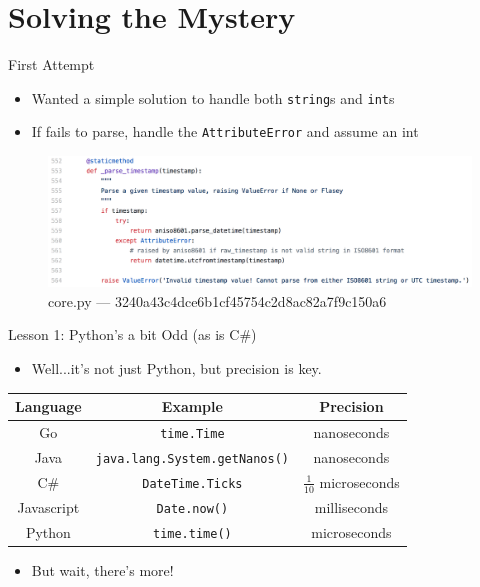 \documentclass[10pt]{beamer}
\begin{document}
\section{Solving the Mystery}
\begin{frame}{First Attempt}
	\begin{itemize}
		\item Wanted a simple solution to handle both \texttt{string}s and \texttt{int}s
		\item If fails to parse, handle the \texttt{AttributeError} and assume an int
	\end{itemize}
	\begin{figure}
		\centering
		\includegraphics[width=\textwidth]{images/commit1.png}
		\caption{core.py --- 3240a43c4dce6b1cf45754c2d8ac82a7f9c150a6}
	\end{figure}
\end{frame}

\renewcommand{\arraystretch}{1.5}
\begin{frame}{Lesson 1: Python's a bit Odd (as is C\#)}
	\begin{itemize}
		\item Well...it's not just Python, but precision is key.
	\end{itemize}
	\begin{center}
		\begin{tabular}{ c c c }
			Language & Example & Precision \\
			\hline
			Go & \texttt{time.Time} & nanoseconds \\
			Java & \texttt{java.lang.System.getNanos()} & nanoseconds \\
			C\# & \texttt{DateTime.Ticks} & \(\frac{1}{10}\) microseconds \\
			Javascript & \texttt{Date.now()} & milliseconds \\
			Python & \texttt{time.time()} & microseconds
		\end{tabular}
	\end{center}
	\begin{itemize}
		\item But wait, there's more!
	\end{itemize}
\end{frame}
\end{document}
